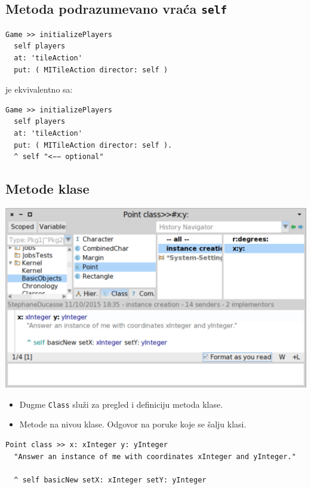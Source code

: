 \documentclass[presentation]{beamer}
\begin{document}
\subsection{Metoda podrazumevano vraća \texttt{self}}
\label{sec:org5a9b5ff}

\begin{verbatim}
Game >> initializePlayers
  self players
  at: 'tileAction'
  put: ( MITileAction director: self )
\end{verbatim}

je ekvivalentno sa:

\begin{verbatim}
Game >> initializePlayers
  self players
  at: 'tileAction'
  put: ( MITileAction director: self ).
  ^ self "<−− optional"
\end{verbatim}

\subsection{Metode klase}
\label{sec:org1be758c}

\begin{center}
\includegraphics[width=.9\linewidth]{./slike/class_methods.png}
\end{center}

\begin{itemize}
\item Dugme \texttt{Class} služi za pregled i definiciju metoda klase.
\item Metode na nivou klase. Odgovor na poruke koje se šalju klasi.
\end{itemize}

\begin{verbatim}
Point class >> x: xInteger y: yInteger
  "Answer an instance of me with coordinates xInteger and yInteger."

  ^ self basicNew setX: xInteger setY: yInteger
\end{verbatim}
\end{document}
